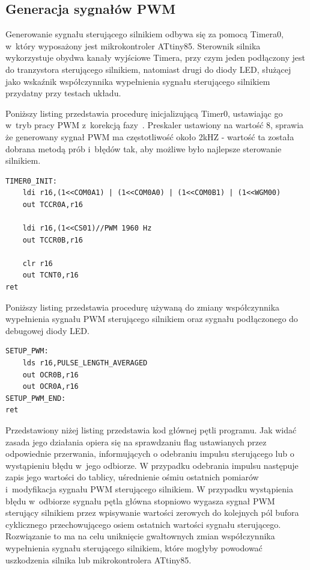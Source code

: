 \documentclass[11pt, twoside]{Thesis} %
\begin{document}
\subsection{Generacja sygnałów PWM}

Generowanie sygnału sterującego silnikiem odbywa się za pomocą Timera0, w~który wyposażony jest mikrokontroler ATtiny85. Sterownik silnika wykorzystuje obydwa kanały wyjściowe Timera, przy czym jeden podłączony jest do tranzystora sterującego silnikiem, natomiast drugi do diody LED, służącej jako wskaźnik współczynnika wypełnienia sygnału sterującego silnikiem przydatny przy testach układu. 

Poniższy listing przedstawia procedurę inicjalizującą Timer0, ustawiając go w~tryb pracy PWM z~korekcją fazy~\cite{ds_attiny85}. Preskaler ustawiony na wartość 8, sprawia że generowany sygnał PWM ma częstotliwość około 2kHZ - wartość ta została dobrana metodą prób i~błędów tak, aby możliwe było najlepsze sterowanie silnikiem. 

\begin{lstlisting}
TIMER0_INIT:
	ldi r16,(1<<COM0A1) | (1<<COM0A0) | (1<<COM0B1) | (1<<WGM00)
	out TCCR0A,r16

	ldi r16,(1<<CS01)//PWM 1960 Hz
	out TCCR0B,r16

	clr r16
	out TCNT0,r16
ret
\end{lstlisting}


Poniższy listing przedstawia procedurę używaną do zmiany współczynnika wypełnienia sygnału PWM sterującego silnikiem oraz sygnału podłączonego do debugowej diody LED.

\begin{lstlisting}
SETUP_PWM:
	lds r16,PULSE_LENGTH_AVERAGED
	out OCR0B,r16
	out OCR0A,r16
SETUP_PWM_END:
ret
\end{lstlisting}


Przedstawiony niżej listing przedstawia kod głównej pętli programu. Jak widać zasada jego działania opiera się na sprawdzaniu flag ustawianych przez odpowiednie przerwania, informujących o odebraniu impulsu sterującego lub o wystąpieniu błędu w~jego odbiorze. W przypadku odebrania impulsu następuje zapis jego wartości do tablicy, uśrednienie ośmiu ostatnich pomiarów i~modyfikacja sygnału PWM sterującego silnikiem. W przypadku wystąpienia błędu w~odbiorze sygnału pętla główna stopniowo wygasza sygnał PWM sterujący silnikiem przez wpisywanie wartości zerowych do kolejnych pól bufora cyklicznego przechowującego osiem ostatnich wartości sygnału sterującego. Rozwiązanie to ma na celu uniknięcie gwałtownych zmian współczynnika wypełnienia sygnału sterującego silnikiem, które mogłyby powodować uszkodzenia silnika lub mikrokontrolera ATtiny85.
\end{document}

